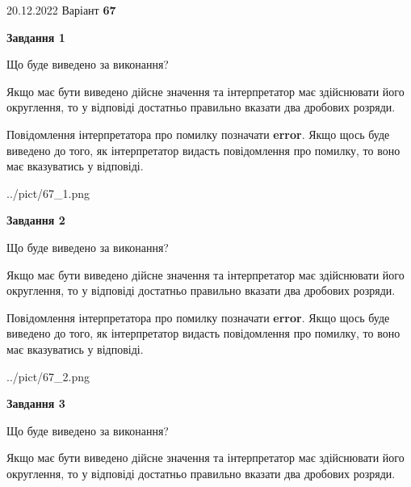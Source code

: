 \documentclass[12pt, ukrainian]{article}
\begin{document}
{20.12.2022 Варіант \No \textbf { 67 }\par}
{
\begin {Large}

{\begin {center}\textbf{Завдання 1}\end {center}}\par
Що буде виведено за виконання? \par

Якщо має бути виведено дійсне значення та інтерпретатор має здійснювати його округлення, 
то у відповіді достатньо правильно вказати два дробових розряди.

Повідомлення інтерпретатора про помилку позначати \textbf{error}.
Якщо щось буде виведено до того, як інтерпретатор видасть повідомлення про помилку, 
то воно має вказуватись у відповіді. \par

\begin{center}
	{../pict/67_1.png}
\end{center}
\newpage

{\begin {center}\textbf{Завдання 2}\end {center}}\par
Що буде виведено за виконання? \par

Якщо має бути виведено дійсне значення та інтерпретатор має здійснювати його округлення, 
то у відповіді достатньо правильно вказати два дробових розряди.

Повідомлення інтерпретатора про помилку позначати \textbf{error}.
Якщо щось буде виведено до того, як інтерпретатор видасть повідомлення про помилку, 
то воно має вказуватись у відповіді. \par

\begin{center}
	{../pict/67_2.png}
\end{center}
\newpage

{\begin {center}\textbf{Завдання 3}\end {center}}\par
Що буде виведено за виконання? \par

Якщо має бути виведено дійсне значення та інтерпретатор має здійснювати його округлення, 
то у відповіді достатньо правильно вказати два дробових розряди.


\end{Large}}
\end{document}
